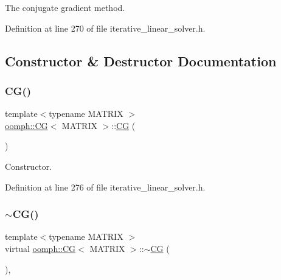 The conjugate gradient method. 

Definition at line 270 of file iterative\+\_\+linear\+\_\+solver.\+h.



\subsection{Constructor \& Destructor Documentation}
\mbox{\label{classoomph_1_1CG_a03da73843394af90b918f2d24ee2f3a1}} 
\subsubsection{\texorpdfstring{C\+G()}{CG()}\hspace{0.1cm}{\footnotesize\ttfamily [1/2]}}
{\footnotesize\ttfamily template$<$typename M\+A\+T\+R\+IX $>$ \\
\hyperlink{classoomph_1_1CG}{oomph\+::\+CG}$<$ M\+A\+T\+R\+IX $>$\+::\hyperlink{classoomph_1_1CG}{CG} (\begin{DoxyParamCaption}{ }\end{DoxyParamCaption})\hspace{0.3cm}{\ttfamily [inline]}}



Constructor. 



Definition at line 276 of file iterative\+\_\+linear\+\_\+solver.\+h.

\mbox{\label{classoomph_1_1CG_a35c9254d858fbc3d8f7061c1bec289c5}} 
\subsubsection{\texorpdfstring{$\sim$\+C\+G()}{~CG()}}
{\footnotesize\ttfamily template$<$typename M\+A\+T\+R\+IX $>$ \\
virtual \hyperlink{classoomph_1_1CG}{oomph\+::\+CG}$<$ M\+A\+T\+R\+IX $>$\+::$\sim$\hyperlink{classoomph_1_1CG}{CG} (\begin{DoxyParamCaption}{ }\end{DoxyParamCaption})\hspace{0.3cm}{\ttfamily [inline]}, {\ttfamily [virtual]}}



